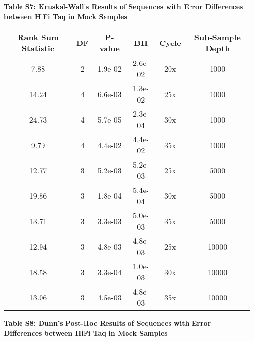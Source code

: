 \documentclass[12pt,]{article}
\begin{document}
\newpage

\textbf{Table S7: Kruskal-Wallis Results of Sequences with Error
Differences between HiFi Taq in Mock Samples}

\begin{longtable}[]{@{}cccccc@{}}
\toprule
Rank Sum Statistic & DF & P-value & BH & Cycle & Sub-Sample
Depth\tabularnewline
\midrule
\endhead
7.88 & 2 & 1.9e-02 & 2.6e-02 & 20x & 1000\tabularnewline
14.24 & 4 & 6.6e-03 & 1.3e-02 & 25x & 1000\tabularnewline
24.73 & 4 & 5.7e-05 & 2.3e-04 & 30x & 1000\tabularnewline
9.79 & 4 & 4.4e-02 & 4.4e-02 & 35x & 1000\tabularnewline
12.77 & 3 & 5.2e-03 & 5.2e-03 & 25x & 5000\tabularnewline
19.86 & 3 & 1.8e-04 & 5.4e-04 & 30x & 5000\tabularnewline
13.71 & 3 & 3.3e-03 & 5.0e-03 & 35x & 5000\tabularnewline
12.94 & 3 & 4.8e-03 & 4.8e-03 & 25x & 10000\tabularnewline
18.58 & 3 & 3.3e-04 & 1.0e-03 & 30x & 10000\tabularnewline
13.06 & 3 & 4.5e-03 & 4.8e-03 & 35x & 10000\tabularnewline
\bottomrule
\end{longtable}

\newpage

\textbf{Table S8: Dunn's Post-Hoc Results of Sequences with Error
Differences between HiFi Taq in Mock Samples}
\end{document}
